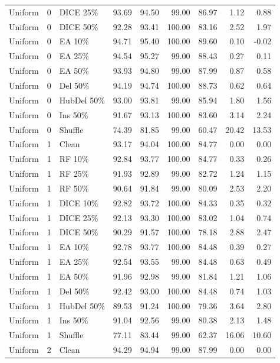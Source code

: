 {\begin{longtable}{rllrrrrrr}
Uniform & 0 & DICE 25\% & 93.69 & 94.50 & 99.00 & 86.97 & 1.12 & 0.88 \\
Uniform & 0 & DICE 50\% & 92.28 & 93.41 & 100.00 & 83.16 & 2.52 & 1.97 \\
Uniform & 0 & EA 10\% & 94.71 & 95.40 & 100.00 & 89.60 & 0.10 & -0.02 \\
Uniform & 0 & EA 25\% & 94.54 & 95.27 & 99.00 & 88.43 & 0.27 & 0.11 \\
Uniform & 0 & EA 50\% & 93.93 & 94.80 & 99.00 & 87.99 & 0.87 & 0.58 \\
Uniform & 0 & Del 50\% & 94.19 & 94.74 & 100.00 & 88.73 & 0.62 & 0.64 \\
Uniform & 0 & HubDel 50\% & 93.00 & 93.81 & 99.00 & 85.94 & 1.80 & 1.56 \\
Uniform & 0 & Ins 50\% & 91.67 & 93.13 & 100.00 & 83.60 & 3.14 & 2.24 \\
Uniform & 0 & Shuffle & 74.39 & 81.85 & 99.00 & 60.47 & 20.42 & 13.53 \\
Uniform & 1 & Clean & 93.17 & 94.04 & 100.00 & 84.77 & 0.00 & 0.00 \\
Uniform & 1 & RF 10\% & 92.84 & 93.77 & 100.00 & 84.77 & 0.33 & 0.26 \\
Uniform & 1 & RF 25\% & 91.93 & 92.89 & 99.00 & 82.72 & 1.24 & 1.15 \\
Uniform & 1 & RF 50\% & 90.64 & 91.84 & 99.00 & 80.09 & 2.53 & 2.20 \\
Uniform & 1 & DICE 10\% & 92.82 & 93.72 & 100.00 & 84.33 & 0.35 & 0.32 \\
Uniform & 1 & DICE 25\% & 92.13 & 93.30 & 100.00 & 83.02 & 1.04 & 0.74 \\
Uniform & 1 & DICE 50\% & 90.29 & 91.57 & 100.00 & 78.18 & 2.88 & 2.47 \\
Uniform & 1 & EA 10\% & 92.78 & 93.77 & 100.00 & 84.48 & 0.39 & 0.27 \\
Uniform & 1 & EA 25\% & 92.54 & 93.55 & 99.00 & 84.48 & 0.63 & 0.49 \\
Uniform & 1 & EA 50\% & 91.96 & 92.98 & 99.00 & 81.84 & 1.21 & 1.06 \\
Uniform & 1 & Del 50\% & 92.42 & 93.00 & 100.00 & 84.48 & 0.74 & 1.03 \\
Uniform & 1 & HubDel 50\% & 89.53 & 91.24 & 100.00 & 79.36 & 3.64 & 2.80 \\
Uniform & 1 & Ins 50\% & 91.04 & 92.56 & 99.00 & 80.38 & 2.13 & 1.48 \\
Uniform & 1 & Shuffle & 77.11 & 83.44 & 99.00 & 62.37 & 16.06 & 10.60 \\
Uniform & 2 & Clean & 94.29 & 94.94 & 99.00 & 87.99 & 0.00 & 0.00 \\

\end{longtable}}
